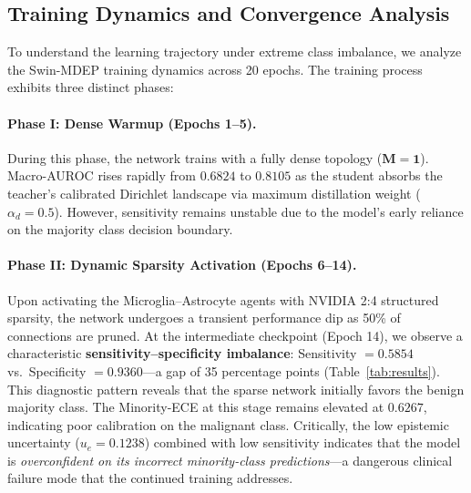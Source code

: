 \documentclass[letterpaper]{article} %
\begin{document}
\subsection{Training Dynamics and Convergence Analysis}\label{subsec:dynamics}
To understand the learning trajectory under extreme class imbalance, we analyze the Swin-MDEP training dynamics across 20 epochs. The training process exhibits three distinct phases:

\paragraph{Phase I: Dense Warmup (Epochs 1--5).} During this phase, the network trains with a fully dense topology ($\bm{M} = \bm{1}$). Macro-AUROC rises rapidly from $0.6824$ to $0.8105$ as the student absorbs the teacher's calibrated Dirichlet landscape via maximum distillation weight ($\alpha_d = 0.5$). However, sensitivity remains unstable due to the model's early reliance on the majority class decision boundary.

\paragraph{Phase II: Dynamic Sparsity Activation (Epochs 6--14).} Upon activating the Microglia--Astrocyte agents with NVIDIA 2:4 structured sparsity, the network undergoes a transient performance dip as 50\% of connections are pruned. At the intermediate checkpoint (Epoch 14), we observe a characteristic \textbf{sensitivity--specificity imbalance}: Sensitivity $= 0.5854$ vs.\ Specificity $= 0.9360$---a gap of 35 percentage points (Table~\ref{tab:results}). This diagnostic pattern reveals that the sparse network initially favors the benign majority class. The Minority-ECE at this stage remains elevated at $0.6267$, indicating poor calibration on the malignant class. Critically, the low epistemic uncertainty ($u_e = 0.1238$) combined with low sensitivity indicates that the model is \emph{overconfident on its incorrect minority-class predictions}---a dangerous clinical failure mode that the continued training addresses.
\end{document}
